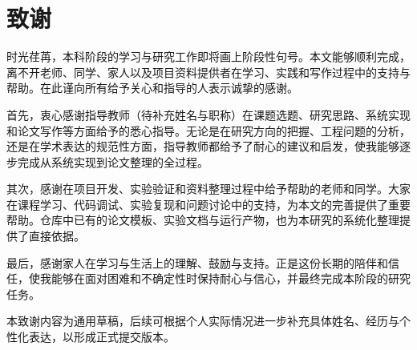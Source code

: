 
\chapter{致谢}

时光荏苒，本科阶段的学习与研究工作即将画上阶段性句号。本文能够顺利完成，离不开老师、同学、家人以及项目资料提供者在学习、实践和写作过程中的支持与帮助。在此谨向所有给予关心和指导的人表示诚挚的感谢。

首先，衷心感谢指导教师（待补充姓名与职称）在课题选题、研究思路、系统实现和论文写作等方面给予的悉心指导。无论是在研究方向的把握、工程问题的分析，还是在学术表达的规范性方面，指导教师都给予了耐心的建议和启发，使我能够逐步完成从系统实现到论文整理的全过程。

其次，感谢在项目开发、实验验证和资料整理过程中给予帮助的老师和同学。大家在课程学习、代码调试、实验复现和问题讨论中的支持，为本文的完善提供了重要帮助。仓库中已有的论文模板、实验文档与运行产物，也为本研究的系统化整理提供了直接依据。

最后，感谢家人在学习与生活上的理解、鼓励与支持。正是这份长期的陪伴和信任，使我能够在面对困难和不确定性时保持耐心与信心，并最终完成本阶段的研究任务。

本致谢内容为通用草稿，后续可根据个人实际情况进一步补充具体姓名、经历与个性化表达，以形成正式提交版本。
